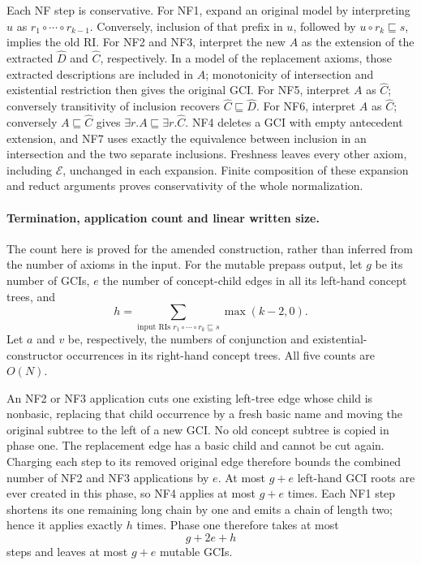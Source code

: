 Each NF step is conservative.  For NF1, expand an original model by
interpreting \(u\) as \(r_1\circ\cdots\circ r_{k-1}\).
Conversely, inclusion of that prefix in \(u\), followed by
\(u\circ r_k\sqsubseteq s\), implies the old RI.
For NF2 and NF3, interpret the new \(A\) as the extension of the
extracted \(\widehat D\) and \(\widehat C\), respectively.
In a model of the replacement axioms, those extracted descriptions are
included in \(A\); monotonicity of intersection and existential restriction
then gives the original GCI.
For NF5, interpret \(A\) as \(\widehat C\); conversely transitivity
of inclusion recovers \(\widehat C\sqsubseteq\widehat D\).
For NF6, interpret \(A\) as \(\widehat C\); conversely
\(A\sqsubseteq\widehat C\) gives
\(\exists r.A\sqsubseteq\exists r.\widehat C\).
NF4 deletes a GCI with empty antecedent extension, and NF7 uses exactly
the equivalence between inclusion in an intersection and the two separate
inclusions.  Freshness leaves every other axiom, including \(\mathcal E\),
unchanged in each expansion.  Finite composition of these expansion and
reduct arguments proves conservativity of the whole normalization.

\paragraph{Termination, application count and linear written size.}
The count here is proved for the amended construction, rather than inferred
from the number of axioms in the input.
For the mutable prepass output, let \(g\) be its number of GCIs,
\(e\) the number of concept-child edges in all its left-hand concept
trees, and
\[
 h=\sum_{\text{input RIs }r_1\circ\cdots\circ r_k\sqsubseteq s}
            \max(k-2,0).
\]
Let \(a\) and \(v\) be, respectively, the numbers of conjunction and
existential-constructor occurrences in its right-hand concept trees.
All five counts are \(O(N)\).

An NF2 or NF3 application cuts one existing left-tree edge whose child
is nonbasic, replacing that child occurrence by a fresh basic name and
moving the original subtree to the left of a new GCI.
No old concept subtree is copied in phase one.  The replacement edge has
a basic child and cannot be cut again.
Charging each step to its removed original edge therefore bounds the
combined number of NF2 and NF3 applications by \(e\).
At most \(g+e\) left-hand GCI roots are ever created in this phase, so
NF4 applies at most \(g+e\) times.  Each NF1 step shortens its one
remaining long chain by one and emits a chain of length two; hence it
applies exactly \(h\) times.
Phase one therefore takes at most
\[
 g+2e+h
\]
steps and leaves at most \(g+e\) mutable GCIs.

